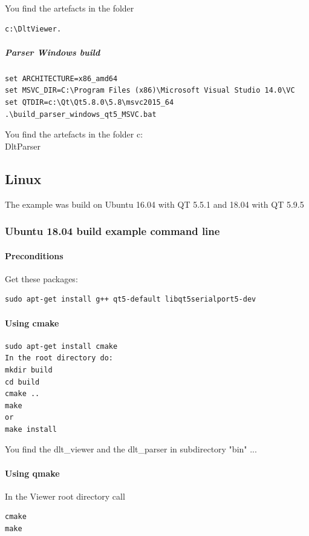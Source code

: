 \documentclass[a4paper,11pt]{article}
\begin{document}
You find the artefacts in the folder 
\begin{verbatim}
c:\DltViewer.
\end{verbatim}

\subparagraph{Parser Windows build}

\begin{verbatim}
set ARCHITECTURE=x86_amd64
set MSVC_DIR=C:\Program Files (x86)\Microsoft Visual Studio 14.0\VC
set QTDIR=c:\Qt\Qt5.8.0\5.8\msvc2015_64
.\build_parser_windows_qt5_MSVC.bat
\end{verbatim}

You find the artefacts in the folder c:\\DltParser

\subsection{Linux}

The example was build on Ubuntu 16.04 with QT 5.5.1 and 18.04 with QT 5.9.5

\subsubsection{Ubuntu 18.04 build example command line}
\paragraph{Preconditions}
Get these packages:
\begin{verbatim}
sudo apt-get install g++ qt5-default libqt5serialport5-dev
\end{verbatim}

\paragraph{Using cmake}
\begin{verbatim}
sudo apt-get install cmake
In the root directory do:
mkdir build
cd build
cmake ..
make
or
make install
\end{verbatim}
You find the dlt\_viewer and the dlt\_parser in subdirectory "bin" ...

\paragraph{Using qmake}
In the Viewer root directory call

\begin{verbatim}
cmake
make
\end{verbatim}
\end{document}
